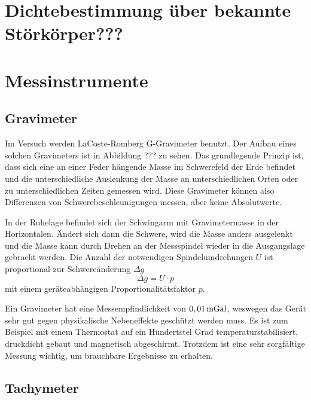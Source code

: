\section{Dichtebestimmung über bekannte Störkörper???}


\section{Messinstrumente}

\subsection{Gravimeter}

Im Versuch werden LaCoste-Romberg G-Gravimeter benutzt. Der Aufbau eines solchen Gravimeters ist in Abbildung ??? zu sehen. Das grundlegende Prinzip ist, dass sich eine an einer Feder hängende Masse im Schwerefeld der Erde befindet und die unterschiedliche Auslenkung der Masse an unterschiedlichen Orten oder zu unterschiedlichen Zeiten gemessen wird. Diese Gravimeter können also Differenzen von Schwerebeschleunigungen messen, aber keine Absolutwerte.


In der Ruhelage befindet sich der Schwingarm mit Gravimetermasse in der Horizontalen. Ändert sich dann die Schwere, wird die Masse anders ausgelenkt und die Masse kann durch Drehen an der Messspindel wieder in die Ausgangslage gebracht werden. Die Anzahl der notwendigen Spindelumdrehungen $U$ ist proportional zur Schwereänderung $\Delta g$
\begin{equation}
 \Delta g= U\cdot p
\end{equation}
mit einem geräteabhängigen Proportionalitätsfaktor $p$.

Ein Gravimeter hat eine Messempfindlichkeit von $0,01\,\mathrm{mGal}$, weswegen das Gerät sehr gut gegen physikalische Nebeneffekte geschützt werden muss. Es ist zum Beispiel mit einem Thermostat auf ein Hundertstel Grad temperaturstabilisiert, druckdicht gebaut und magnetisch abgeschirmt. Trotzdem ist eine sehr sorgfältige Messung wichtig, um brauchbare Ergebnisse zu erhalten. 

\subsection{Tachymeter}

